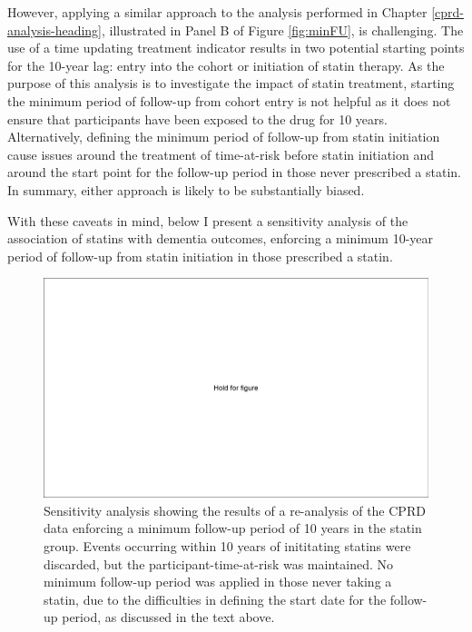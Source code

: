 \documentclass[a4paper, twoside]{templates/ociamthesis}
\begin{document}
However, applying a similar approach to the analysis performed in Chapter \ref{cprd-analysis-heading}, illustrated in Panel B of Figure \ref{fig:minFU}, is challenging. The use of a time updating treatment indicator results in two potential starting points for the 10-year lag: entry into the cohort or initiation of statin therapy. As the purpose of this analysis is to investigate the impact of statin treatment, starting the minimum period of follow-up from cohort entry is not helpful as it does not ensure that participants have been exposed to the drug for 10 years. Alternatively, defining the minimum period of follow-up from statin initiation cause issues around the treatment of time-at-risk before statin initiation and around the start point for the follow-up period in those never prescribed a statin. In summary, either approach is likely to be substantially biased.

With these caveats in mind, below I present a sensitivity analysis of the association of statins with dementia outcomes, enforcing a minimum 10-year period of follow-up from statin initiation in those prescribed a statin.





\begin{figure}[H]
\includegraphics[width=1\linewidth]{figures/hold} \caption[Sensitivity analysis of the CPRD data with a 10 year minimum period of follow-up.]{Sensitivity analysis showing the results of a re-analysis of the CPRD data enforcing a minimum follow-up period of 10 years in the statin group. Events occurring within 10 years of inititating statins were discarded, but the participant-time-at-risk was maintained. No minimum follow-up period was applied in those never taking a statin, due to the difficulties in defining the start date for the follow-up period, as discussed in the text above.}\label{fig:cprdMinFu}
\end{figure}
\end{document}
